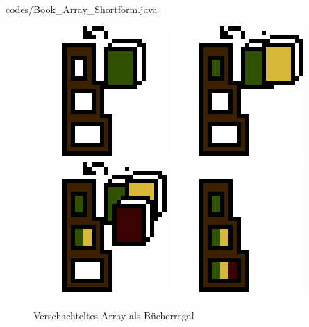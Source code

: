 \documentclass{../tuda-beamer}
\begin{document}
  \begin{frame}[c]
    \begin{figure}[h]
      \centering
      
    \end{figure}
  \end{frame}

  \begin{frame}[c]
    
  \end{frame}

  \begin{frame}
    
    {codes/Book_Array_Shortform.java}
  \end{frame}

  \begin{frame}[c]
    \begin{figure}[h]
      \centering
      \includegraphics[width=.2\linewidth]{graphics/lib_2_1.png}
      \includegraphics[width=.2\linewidth]{graphics/lib_2_2.png}
      \includegraphics[width=.2\linewidth]{graphics/lib_2_3.png}
      \includegraphics[width=.2\linewidth]{graphics/lib_2_4.png}
      \caption{Verschachteltes Array als Bücherregal}
    \end{figure}
  \end{frame}
\end{document}
